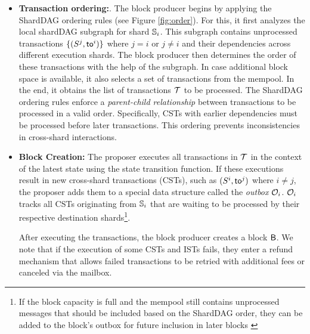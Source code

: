 \begin{itemize}
	\item \textbf{Transaction ordering:}.
	      The block producer begins by applying the ShardDAG ordering
	      rules (see Figure \ref{fig:order}). For this,
	      it first analyzes the local shardDAG subgraph for shard
	      $\mathbb{S}_i$. This subgraph contains unprocessed transactions
	      $
		      \{(S^j, \mathsf{to}^i)\}$ where $j = i$ or $j \neq i$
	      and their dependencies
	      across different execution shards. The block producer then
	      determines the
	      order of these transactions with the help of the subgraph.
	      In case additional block space is available, it also selects
	      a set of
	      transactions from the mempool. In the end, it obtains the
	      list of transactions ${\mathcal{T}}$ to be processed.
	      The ShardDAG ordering rules enforce a \textit{parent-child
		      relationship} between transactions to be processed
	      in a valid order.
	      Specifically, CSTs with earlier dependencies must be
	      processed before
	      later transactions. This ordering prevents inconsistencies
	      in cross-shard
	      interactions.

	\item \textbf{Block Creation:} The proposer executes all
	      transactions in $ {\mathcal{T}} $ in the context of the latest
	      state using the
	      state transition function. If these executions
	      result in new cross-shard transactions
	      (CSTs), such as $ (S^i, \mathsf{to}^j) $ where $ i \neq j $,
	      the proposer
	      adds them to a special data structure called the
	      \emph{outbox} $ \mathcal{O}_i
	      $. $ \mathcal{O}_i $ tracks all CSTs originating from $ \mathbb{S}_i
	      $ that are
	      waiting to be processed by their respective destination
	      shards\footnote{If
		      the block capacity is full and the mempool still
		      contains unprocessed messages  that should be
		      included based on the
		      ShardDAG order, they can be
		      added to the block's outbox for future inclusion in
		      later blocks
		      \cite{sharddag}}.

	      After executing the transactions, the block producer creates
	      a
	      block $ \mathsf{B} $. We note that if the execution of some CSTs
	      and ISTs fails, they enter a refund mechanism that allows
	      failed
	      transactions to be retried with additional fees or canceled
	      via the
	      mailbox.


\end{itemize}
